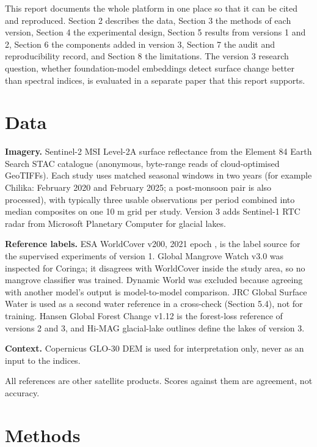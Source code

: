 \documentclass[11pt]{article}
\begin{document}
This report documents the whole platform in one place so that it can be cited and reproduced. Section 2 describes the data, Section 3 the methods of each version, Section 4 the experimental design, Section 5 results from versions 1 and 2, Section 6 the components added in version 3, Section 7 the audit and reproducibility record, and Section 8 the limitations. The version 3 research question, whether foundation-model embeddings detect surface change better than spectral indices, is evaluated in a separate paper that this report supports.

\section{Data}

\textbf{Imagery.} Sentinel-2 MSI Level-2A surface reflectance from the Element 84 Earth Search STAC catalogue (anonymous, byte-range reads of cloud-optimised GeoTIFFs). Each study uses matched seasonal windows in two years (for example Chilika: February 2020 and February 2025; a post-monsoon pair is also processed), with typically three usable observations per period combined into median composites on one 10 m grid per study. Version 3 adds Sentinel-1 RTC radar from Microsoft Planetary Computer for glacial lakes.

\textbf{Reference labels.} ESA WorldCover v200, 2021 epoch \cite{zanaga2022}, is the label source for the supervised experiments of version 1. Global Mangrove Watch v3.0 \cite{bunting2022} was inspected for Coringa; it disagrees with WorldCover inside the study area, so no mangrove classifier was trained. Dynamic World was excluded because agreeing with another model's output is model-to-model comparison. JRC Global Surface Water \cite{pekel2016} is used as a second water reference in a cross-check (Section 5.4), not for training. Hansen Global Forest Change v1.12 \cite{hansen2013} is the forest-loss reference of versions 2 and 3, and Hi-MAG glacial-lake outlines \cite{chen2021himag} define the lakes of version 3.

\textbf{Context.} Copernicus GLO-30 DEM is used for interpretation only, never as an input to the indices.

All references are other satellite products. Scores against them are agreement, not accuracy.

\section{Methods}
\end{document}
